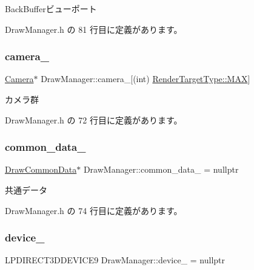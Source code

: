 Back\+Bufferビューポート 



 Draw\+Manager.\+h の 81 行目に定義があります。

\mbox{\label{class_draw_manager_a7180376f029c4ce998dfa83edfc0343e}} 
\subsubsection{\texorpdfstring{camera\+\_\+}{camera\_}}
{\footnotesize\ttfamily \mbox{\hyperlink{class_camera}{Camera}}$\ast$ Draw\+Manager\+::camera\+\_\+\mbox{[}(int) \mbox{\hyperlink{class_draw_manager_a7ade407aee706c02454da2e53a559c9ca26a4b44a837bf97b972628509912b4a5}{Render\+Target\+Type\+::\+M\+AX}}\mbox{]}\hspace{0.3cm}{\ttfamily [private]}}



カメラ群 



 Draw\+Manager.\+h の 72 行目に定義があります。

\mbox{\label{class_draw_manager_af3a485559a0775ae3c91a9e11f0b38b9}} 
\subsubsection{\texorpdfstring{common\+\_\+data\+\_\+}{common\_data\_}}
{\footnotesize\ttfamily \mbox{\hyperlink{class_draw_common_data}{Draw\+Common\+Data}}$\ast$ Draw\+Manager\+::common\+\_\+data\+\_\+ = nullptr\hspace{0.3cm}{\ttfamily [private]}}



共通データ 



 Draw\+Manager.\+h の 74 行目に定義があります。

\mbox{\label{class_draw_manager_a8a78d17df29e0b554192e29e0fda1b93}} 
\subsubsection{\texorpdfstring{device\+\_\+}{device\_}}
{\footnotesize\ttfamily L\+P\+D\+I\+R\+E\+C\+T3\+D\+D\+E\+V\+I\+C\+E9 Draw\+Manager\+::device\+\_\+ = nullptr\hspace{0.3cm}{\ttfamily [private]}}



